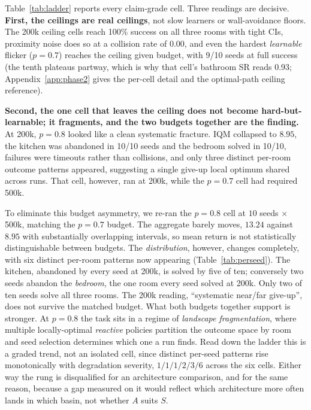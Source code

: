 \documentclass{article}
\begin{document}
Table~\ref{tab:ladder} reports every claim-grade cell. Three readings are decisive.
\textbf{First, the ceilings are real ceilings}, not slow learners or wall-avoidance floors.
The 200k ceiling cells reach 100\% success on all three rooms with tight CIs, proximity noise
does so at a collision rate of $0.00$, and even the hardest \emph{learnable} flicker
($p=0.7$) reaches the ceiling given budget, with 9/10 seeds at full success (the tenth
plateaus partway, which is why that cell's bathroom SR reads 0.93; Appendix~\ref{app:phase2}
gives the per-cell detail and the optimal-path ceiling reference).

\textbf{Second, the one cell that leaves the ceiling does not become hard-but-learnable; it
fragments, and the two budgets together are the finding.} At 200k, $p=0.8$ looked like a clean
systematic fracture. IQM collapsed to $8.95$, the kitchen was abandoned in 10/10 seeds and the
bedroom solved in 10/10, failures were timeouts rather than collisions, and only three
distinct per-room outcome patterns appeared, suggesting a single give-up local optimum shared
across runs. That cell, however, ran at 200k, while the $p=0.7$ cell had required 500k.

To eliminate this budget asymmetry, we re-ran the $p=0.8$ cell at $10$ seeds $\times$ 500k,
matching the $p=0.7$ budget. The aggregate barely moves, $13.24$ against $8.95$
with substantially overlapping intervals, so mean return is not statistically distinguishable
between budgets. The \emph{distribution}, however, changes completely, with six distinct
per-room patterns now appearing (Table~\ref{tab:perseed}). The kitchen, abandoned by every
seed at 200k, is solved by five of ten;
conversely two seeds abandon the \emph{bedroom}, the one room every seed solved at 200k. Only
two of ten seeds solve all three rooms. The 200k reading, ``systematic near/far give-up'',
does not survive the matched budget. What both budgets together support is stronger. At
$p=0.8$ the task sits in a regime of \emph{landscape fragmentation}, where multiple
locally-optimal \emph{reactive} policies partition the outcome space by room and seed
selection determines which one a run finds. Read down the ladder this is a graded trend, not
an isolated cell, since distinct per-seed patterns rise monotonically with degradation
severity, $1/1/1/2/3/6$ across the six cells. Either way the rung is disqualified for an
architecture comparison, and for the same reason, because a gap measured on it would reflect
which architecture more often lands in which basin, not whether $A$ suits $S$.
\end{document}
